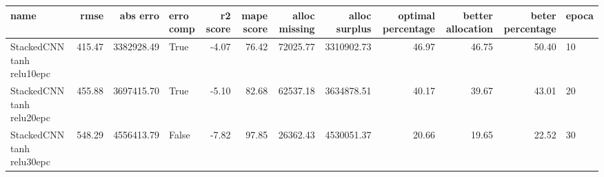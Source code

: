 \begin{tabular}{lrrlrrrrrrrl}
\toprule
name & rmse & abs erro & erro comp & r2 score & mape score & alloc missing & alloc surplus & optimal percentage & better allocation & beter percentage & epoca \\
\midrule
StackedCNN tanh relu10epc & 415.47 & 3382928.49 & True & -4.07 & 76.42 & 72025.77 & 3310902.73 & 46.97 & 46.75 & 50.40 & 10 \\
StackedCNN tanh relu20epc & 455.88 & 3697415.70 & True & -5.10 & 82.68 & 62537.18 & 3634878.51 & 40.17 & 39.67 & 43.01 & 20 \\
StackedCNN tanh relu30epc & 548.29 & 4556413.79 & False & -7.82 & 97.85 & 26362.43 & 4530051.37 & 20.66 & 19.65 & 22.52 & 30 \\
\bottomrule
\end{tabular}
